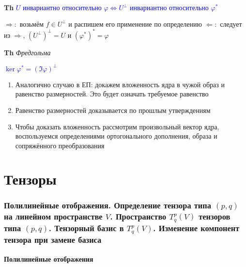 \documentclass[a4paper, 14pt]{article}
\begin{document}
    \textbf{Th} \textcolor{blue}{$U$ инвариантно относительно $\varphi \Leftrightarrow U^\bot$ инвариантно относительно $\varphi^*$}
    
    $\Rightarrow:$ возьмём $f \in U^\bot$ и распишем его применение по определению
    $\Leftarrow:$ следует из $\Rightarrow$, $(U^\bot)^\bot = U$ и $(\varphi^*)^* = \varphi$
    
    \textbf{Th} \textit{Фредгольма}
    
    \textcolor{blue}{$\ker \varphi^* = (\Im \varphi)^\bot$}
    
    \begin{enumerate}
        \item Аналогично случаю в ЕП: докажем вложенность ядра в чужой образ и равенство размерностей.
        Это будет означать требуемое равенство
        \item Равенство размерностей доказывается по прошлым утверждениям
        \item Чтобы доказать вложенность рассмотрим произвольный вектор ядра, воспользуемся определениями
        ортогонального дополнения, образа и сопряжённого преобразования
    \end{enumerate}
    
     \part*{Тензоры}
    
    \section{Полилинейные отображения.
    Определение тензора типа $(p,q)$ на линейном пространстве $V$.
    Пространство $T^p_q (V)$ тензоров типа $(p,q)$.
    Тензорный базис в $T^p_q (V)$.
    Изменение компонент тензора при замене базиса}
    
    \subsection{Полилинейные отображения}
\end{document}
